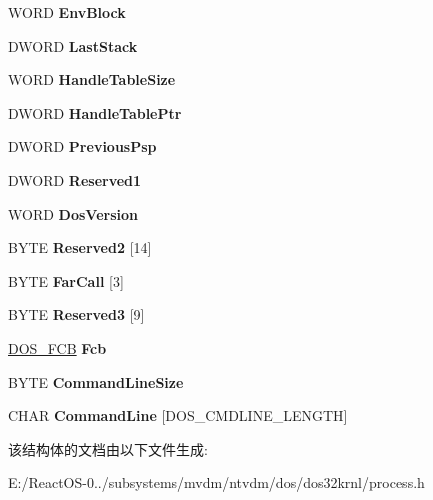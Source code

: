 \begin{DoxyCompactItemize}
W\+O\+RD {\bfseries Env\+Block}
\item 
\mbox{\label{struct___d_o_s___p_s_p_a7b91ae100ffc16a5ad230b94da092e6c}} 
D\+W\+O\+RD {\bfseries Last\+Stack}
\item 
\mbox{\label{struct___d_o_s___p_s_p_a4ad3fc43a915c7e487916d57832807cf}} 
W\+O\+RD {\bfseries Handle\+Table\+Size}
\item 
\mbox{\label{struct___d_o_s___p_s_p_a9c5dd35fd3b330308a7a7f98c46327d1}} 
D\+W\+O\+RD {\bfseries Handle\+Table\+Ptr}
\item 
\mbox{\label{struct___d_o_s___p_s_p_a497072391f9c387c694a9dc3f3a92867}} 
D\+W\+O\+RD {\bfseries Previous\+Psp}
\item 
\mbox{\label{struct___d_o_s___p_s_p_a8bf11ebdcebc43747d3f182b13f3be00}} 
D\+W\+O\+RD {\bfseries Reserved1}
\item 
\mbox{\label{struct___d_o_s___p_s_p_a4f27d676b46f3cef0623754a8140af2d}} 
W\+O\+RD {\bfseries Dos\+Version}
\item 
\mbox{\label{struct___d_o_s___p_s_p_a101e2b7f569667d80a9946b7eb7618b5}} 
B\+Y\+TE {\bfseries Reserved2} \mbox{[}14\mbox{]}
\item 
\mbox{\label{struct___d_o_s___p_s_p_a1d76a0bb01cf0c704022e370c334e3e8}} 
B\+Y\+TE {\bfseries Far\+Call} \mbox{[}3\mbox{]}
\item 
\mbox{\label{struct___d_o_s___p_s_p_a134193bd83eb56c655902bb22c18bb6f}} 
B\+Y\+TE {\bfseries Reserved3} \mbox{[}9\mbox{]}
\item 
\mbox{\label{struct___d_o_s___p_s_p_a2c450bdc3012e558601a2ef088371386}} 
\hyperlink{struct___d_o_s___f_c_b}{D\+O\+S\+\_\+\+F\+CB} {\bfseries Fcb}
\item 
\mbox{\label{struct___d_o_s___p_s_p_a841d8c18a6301183429a5a77c91e0ea4}} 
B\+Y\+TE {\bfseries Command\+Line\+Size}
\item 
\mbox{\label{struct___d_o_s___p_s_p_a33d2e6cb995c570c94cc56868b83512d}} 
C\+H\+AR {\bfseries Command\+Line} \mbox{[}D\+O\+S\+\_\+\+C\+M\+D\+L\+I\+N\+E\+\_\+\+L\+E\+N\+G\+TH\mbox{]}
\end{DoxyCompactItemize}


该结构体的文档由以下文件生成\+:\begin{DoxyCompactItemize}
\item 
E\+:/\+React\+O\+S-\/0../subsystems/mvdm/ntvdm/dos/dos32krnl/process.\+h\end{DoxyCompactItemize}
